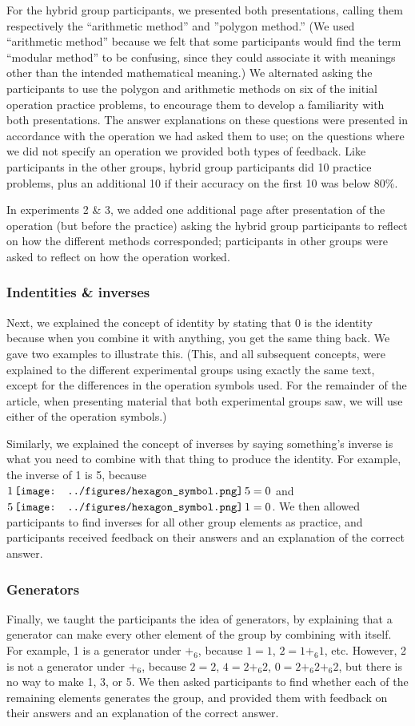 \documentclass[man,mask,10pt]{apa6}
\newcommand{\hex}{\,\vcenter{\hbox{\texttt{[image: ../figures/hexagon\_symbol.png]}}}\,}
\begin{document}
For the hybrid group participants, we presented both presentations, calling them respectively the ``arithmetic method'' and ''polygon method.'' (We used ``arithmetic method'' because we felt that some participants would find the term ``modular method'' to be confusing, since they could associate it with meanings other than the intended mathematical meaning.) We alternated asking the participants to use the polygon and arithmetic methods on six of the initial operation practice problems, to encourage them to develop a familiarity with both presentations. The answer explanations on these questions were presented in accordance with the operation we had asked them to use; on the questions where we did not specify an operation we provided both types of feedback. Like participants in the other groups, hybrid group participants did 10 practice problems, plus an additional 10 if their accuracy on the first 10 was below 80\%.\par
In experiments 2 \& 3, we added one additional page after presentation of the operation (but before the practice) asking the hybrid group participants to reflect on how the different methods corresponded; participants in other groups were asked to reflect on how the operation worked. 
\subsubsection{Indentities \& inverses}
Next, we explained the concept of identity by stating that 0 is the identity because when you combine it with anything, you get the same thing back. We gave two examples to illustrate this. (This, and all subsequent concepts, were explained to the different experimental groups using exactly the same text, except for the differences in the operation symbols used. For the remainder of the article, when presenting material that both experimental groups saw, we will use either of the operation symbols.)\par
Similarly, we explained the concept of inverses by saying something's inverse is what you need to combine with that thing to produce the identity. For example, the inverse of 1 is 5, because $1 \hex 5 = 0$ and $5 \hex 1 = 0$. We then allowed participants to find inverses for all other group elements as practice, and participants received feedback on their answers and an explanation of the correct answer.
\subsubsection{Generators}
Finally, we taught the participants the idea of generators, by explaining that a generator can make every other element of the group by combining with itself. For example, 1 is a generator under $+_6$, because $1 = 1$, $2 = 1 +_6 1$, etc. However, 2 is not a generator under $+_6$, because $2 = 2$, $4 = 2 +_6 2$, $0 = 2 +_6 2 +_6 2$, but there is no way to make 1, 3, or 5. We then asked participants to find whether each of the remaining elements generates the group, and provided them with feedback on their answers and an explanation of the correct answer.
\end{document}
